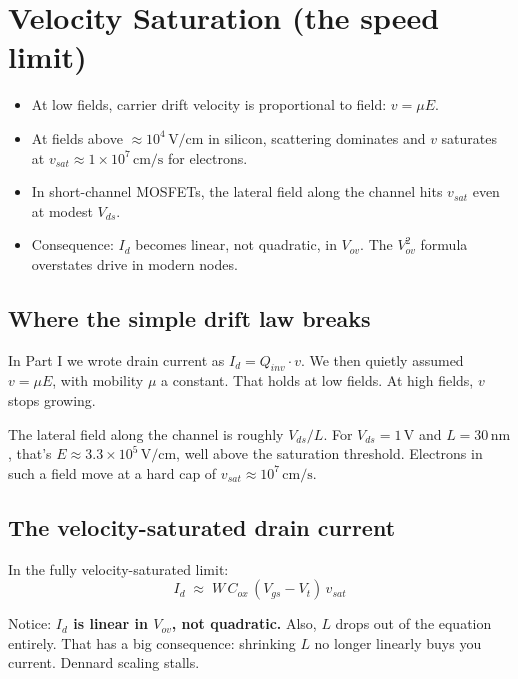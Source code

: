 \documentclass[11pt]{article}
\begin{document}
\section{Velocity Saturation (the speed limit)}

\begin{tldr}
\begin{itemize}[leftmargin=*]
\item At low fields, carrier drift velocity is proportional to field: $v = \mu E$.
\item At fields above $\approx 10^4\,\text{V/cm}$ in silicon, scattering dominates and $v$ saturates at $v_{sat} \approx 1 \times 10^7\,\text{cm/s}$ for electrons.
\item In short-channel MOSFETs, the lateral field along the channel hits $v_{sat}$ even at modest $V_{ds}$.
\item Consequence: $I_d$ becomes linear, not quadratic, in $V_{ov}$. The $V_{ov}^2$ formula overstates drive in modern nodes.
\end{itemize}
\end{tldr}

\subsection{Where the simple drift law breaks}

In Part I we wrote drain current as $I_d = Q_{inv}\cdot v$. We then quietly assumed $v = \mu E$, with mobility $\mu$ a constant. That holds at low fields. At high fields, $v$ stops growing.

The lateral field along the channel is roughly $V_{ds}/L$. For $V_{ds} = 1\,\text{V}$ and $L = 30\,\text{nm}$, that's $E \approx 3.3\times 10^5\,\text{V/cm}$, well above the saturation threshold. Electrons in such a field move at a hard cap of $v_{sat} \approx 10^7\,\text{cm/s}$.

\subsection{The velocity-saturated drain current}

In the fully velocity-saturated limit:
\begin{equation}
I_d \;\approx\; W\,C_{ox}\,(V_{gs} - V_t)\,v_{sat}
\end{equation}

Notice: \textbf{$I_d$ is linear in $V_{ov}$, not quadratic.} Also, $L$ drops out of the equation entirely. That has a big consequence: shrinking $L$ no longer linearly buys you current. Dennard scaling stalls.
\end{document}
